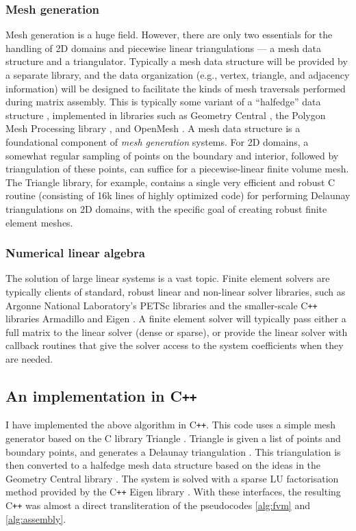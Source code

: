 \subsubsection{Mesh generation}
Mesh generation is a huge field. However, there are only two essentials for the handling of 2D domains and piecewise linear triangulations
--- a mesh data structure and a triangulator. Typically a mesh data structure will be provided by a separate library,
and the data organization (e.g., vertex, triangle, and adjacency information) will be designed to facilitate the kinds
of mesh traversals performed during matrix assembly. This is typically some variant of a ``halfedge'' data structure \cite{polygon_mesh_processing},
implemented in libraries such as Geometry Central \cite{geometry_central},
the Polygon Mesh Processing library \cite{polygon_mesh_processing_library}, and OpenMesh \cite{openmesh}.
A mesh data structure is a foundational component of \textit{mesh generation} systems. For 2D domains, a somewhat regular sampling of points on the boundary
and interior, followed by triangulation of these points, can suffice for a piecewise-linear finite volume mesh.
The Triangle \cite{triangle} library, for example, contains a single very efficient and robust C routine (consisting of 16k lines of highly optimized code)
for performing Delaunay triangulations \cite{orourke}
on 2D domains,
with the specific goal of creating robust finite element meshes.

\subsubsection{Numerical linear algebra}
The solution of large linear systems is a vast topic. Finite element solvers are typically clients
of standard, robust linear and non-linear solver libraries, such as Argonne National Laboratory's PETSc libraries \cite{petsc}
and the smaller-scale C\texttt{++} libraries Armadillo \cite{armadillo} and Eigen \cite{eigen}.
A finite element solver will typically pass either a full matrix to the linear solver (dense or sparse),
or provide the linear solver with callback routines that give the solver access to the system coefficients when they are needed.

\subsection{An implementation in C\texttt{++}}
I have implemented the above algorithm in C\texttt{++}.
This code uses a simple mesh generator based on the C library Triangle \cite{triangle}. Triangle is given a list of points
and boundary points, and generates a Delaunay triangulation \cite{orourke}. This triangulation is then converted to a halfedge mesh data structure
based on the ideas in the Geometry Central library \cite{geometry_central}.
The system is solved with a sparse LU factorisation method provided by the C\texttt{++} Eigen library \cite{eigen}.
With these interfaces, the resulting C\texttt{++} was almost a direct transliteration of the pseudocodes \ref{alg:fvm} and \ref{alg:assembly}.


